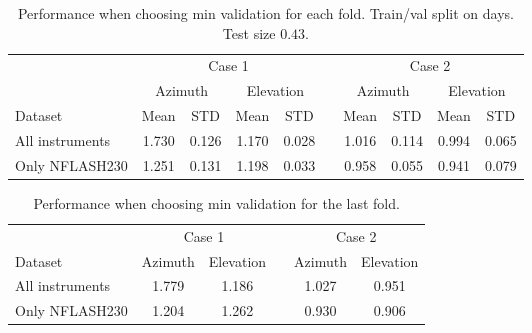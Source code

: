\begin{table}[!htbp]
    \centering
    \label{tab:results_minval_days04}
    \caption{Performance when choosing min validation for each fold. Train/val split on days. Test size $0.43$.}
    \begin{tabular}{lcccc c cccc}
        \toprule
        \multicolumn{1}{c}{} & \multicolumn{4}{c}{Case 1} & & \multicolumn{4}{c}{Case 2} \\
        \cmidrule(lr){2-5} \cmidrule(lr){7-10}
        \multicolumn{1}{c}{} & \multicolumn{2}{c}{Azimuth} & \multicolumn{2}{c}{Elevation} & & \multicolumn{2}{c}{Azimuth} & \multicolumn{2}{c}{Elevation} \\ 
        \cmidrule(lr){2-5} \cmidrule(lr){7-10}
        Dataset &  Mean &  STD &  Mean &  STD & & Mean &  STD &  Mean &  STD \\
        \midrule
        All instruments   &     1.730 &     0.126 &     1.170 &     0.028 &  &   1.016 &     0.114 &     0.994 &     0.065 \\
        Only NFLASH230    &     1.251 &     0.131 &     1.198 &     0.033 &  &   0.958 &     0.055 &     0.941 &     0.079 \\
        \bottomrule
    \end{tabular}
\end{table}

\begin{table}[!htbp]
    \centering
    \label{tab:minval_fold5}
    \caption{Performance when choosing min validation for the last fold.}
    \begin{tabular}{lcc c cc}
        \toprule
        \multicolumn{1}{c}{} & \multicolumn{2}{c}{Case 1} & & \multicolumn{2}{c}{Case 2} \\
        \cmidrule(lr){2-3} \cmidrule(lr){5-6}
        Dataset &  Azimuth  &  Elevation  & & Azimuth  &  Elevation  \\
        \midrule
        All instruments  & 1.779 & 1.186 & & 1.027 & 0.951  \\
        Only NFLASH230   & 1.204 & 1.262 & & 0.930 & 0.906  \\
    \bottomrule
    \end{tabular}
\end{table}

